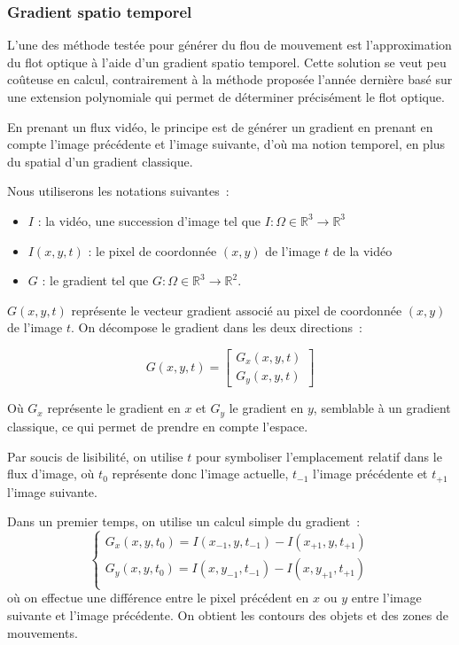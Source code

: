 \documentclass[fleqn,10pt]{SelfArx} %
\begin{document}
%
\subsubsection{Gradient spatio temporel}
L'une des méthode testée pour générer du flou de mouvement est l'approximation du flot optique à l'aide
d'un gradient spatio temporel.
Cette solution se veut peu coûteuse en calcul, contrairement à la méthode proposée l'année
dernière\cite{hfr2lfr2015} basé sur une extension polynomiale\cite{farneback2003} qui permet
de déterminer précisément le flot optique.

En prenant un flux vidéo, le principe est de générer un gradient en prenant en compte l'image précédente et
l'image suivante, d'où ma notion temporel, en plus du spatial d'un gradient classique.

Nous utiliserons les notations suivantes~:
\begin{itemize}
    \item $I$ : la vidéo, une succession d'image tel que $I : \Omega \in \mathbb{R}^{3} \to \mathbb{R}^{3} $
    \item $I(x, y, t)$ : le pixel de coordonnée $(x, y)$ de l'image $t$ de la vidéo
    \item $G$ : le gradient tel que $ G : \Omega \in \mathbb{R}^{3} \to \mathbb{R}^{2} $.

\end{itemize}

$G(x, y, t)$ représente le vecteur gradient associé au pixel de coordonnée $(x, y)$ de l'image $t$.
On décompose le gradient dans les deux directions~:

\[G(x,y,t) = 
    \begin{bmatrix}
        G_{x}(x,y,t) \\
        G_{y}(x,y,t)
    \end{bmatrix}
\]

Où $G_{x}$ représente le gradient en $x$ et $G_{y}$ le gradient en $y$, semblable à un gradient classique, 
ce qui permet de prendre en compte l'espace.

Par soucis de lisibilité, on utilise $t$ pour symboliser l'emplacement relatif dans le flux d'image, où $t_{0}$ représente donc
l'image actuelle, $t_{-1}$ l'image précédente et $t_{+1}$ l'image suivante.

Dans un premier temps, on utilise un calcul simple du gradient~:
\[
    \begin{cases}
        G_{x}(x,y,t_{0}) = I(x_{-1}, y, t_{-1}) - I(x_{+1}, y, t_{+1}) \\
        G_{y}(x,y,t_{0}) = I(x, y_{-1}, t_{-1}) - I(x, y_{+1}, t_{+1}) \\
    \end{cases}
\]
où on effectue une différence entre le pixel précédent en $x$ ou $y$ entre l'image suivante et l'image
précédente. On obtient les contours des objets et des zones de mouvements.
\end{document}
